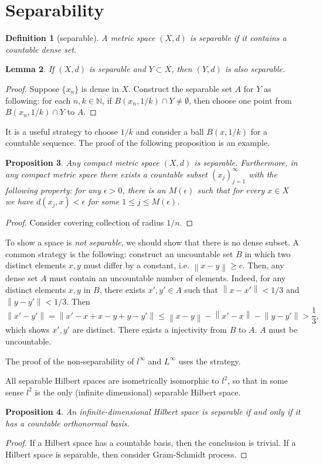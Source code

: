 \documentclass[12pt,a4paper]{article}
\numberwithin{equation}{section}
\theoremstyle{mystyle}
\newtheorem{definition}{Definition}[section]
\newtheorem{lemma}[definition]{Lemma}
\newtheorem{proposition}[definition]{Proposition}
\newcommand{\N}{\mathbb{N}}
\newcommand{\norm}[1]{\left\lVert #1 \right\rVert}
\begin{document}
	\section{Separability}
	\begin{definition}[separable]
		A metric space $(X,d)$ is \emph{separable} if it contains a countable dense set.
	\end{definition}
	\begin{lemma}
		If $(X,d)$ is separable and $Y\subset X$, then $(Y,d)$ is also separable. 
	\end{lemma}
	\begin{proof}
		Suppose $\{x_n\}$ is dense in $X$. Construct the separable set $A$ for $Y$ as following: for each $n,k\in \N$, if $B(x_n,1/k)\cap Y\neq \emptyset$, then choose one point from $B(x_n,1/k)\cap Y$ to $A$.
	\end{proof}
	It is a useful strategy to choose $1/k$ and consider a ball $B(x,1/k)$ for a countable sequence. The proof of the following proposition is an example.
	\begin{proposition}
		Any compact metric space $(X,d)$ is separable. Furthermore, in any compact metric space there exists a countable subset $(x_j)_{j=1}^\infty$ with the following property: for any $\epsilon>0$, there is an $M(\epsilon)$ such that for every $x\in X$ we have $d(x_j,x)<\epsilon$ for some $1\leq j \leq M(\epsilon)$.
	\end{proposition}
	\begin{proof}
		Consider covering collection of radius $1/n$.
	\end{proof}
	
	To show a space is \emph{not separable}, we should show that there is no dense subset. A common strategy is the following: construct an uncountable set $B$ in which two distinct elements $x,y$ must differ by a constant, i.e. $\norm{x-y}\geq c$. Then, any dense set $A$ must contain an uncountable number of elements. Indeed, for any distinct elements $x,y$ in $B$, there exists $x',y'\in A$ such that $\norm{x-x'}<1/3$ and $\norm{y-y'}<1/3$. Then
	$$
	\norm{x'-y'} =\norm{x'-x+x-y+y-y'}\leq \norm{x-y}-\norm{x'-x}-\norm{y-y'}>\frac{1}{3},
	$$
	which shows $x',y'$ are distinct. There exists a injectivity from $B$ to $A$. $A$ must be uncountable.
	
	The proof of the non-separability of $l^\infty$ and $L^\infty$ uses the strategy.
	
	All separable Hilbert spaces are isometrically isomorphic to $l^2$, so that in some sense $l^2$ is the only (infinite dimensional) separable Hilbert space.
	\begin{proposition}
		An infinite-dimensional Hilbert space is separable if and only if it has a countable orthonormal basis.
	\end{proposition}
	\begin{proof}
		If a Hilbert space has a countable basis, then the conclusion is trivial. If a Hilbert space is separable, then consider Gram-Schmidt process.
	\end{proof}
\end{document}

